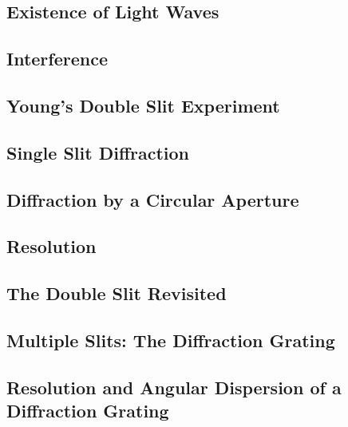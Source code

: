 \documentclass[twocolumn]{article}
\begin{document}
\subsection{Existence of Light Waves}
\begin{outline}
\1 
\end{outline}
\subsection{Interference}
\begin{outline}
\1 
\end{outline}
\subsection{Young's Double Slit Experiment}
\begin{outline}
\1 
\end{outline}
\subsection{Single Slit Diffraction}
\begin{outline}
\1 
\end{outline}
\subsection{Diffraction by a Circular Aperture}
\begin{outline}
\1 
\end{outline}
\subsection{Resolution}
\begin{outline}
\1 
\end{outline}
\subsection{The Double Slit Revisited}
\begin{outline}
\1 
\end{outline}
\subsection{Multiple Slits: The Diffraction Grating}
\begin{outline}
\1 
\end{outline}
\subsection{Resolution and Angular Dispersion of a Diffraction Grating}
\begin{outline}
\1 
\end{outline}
\end{document}
